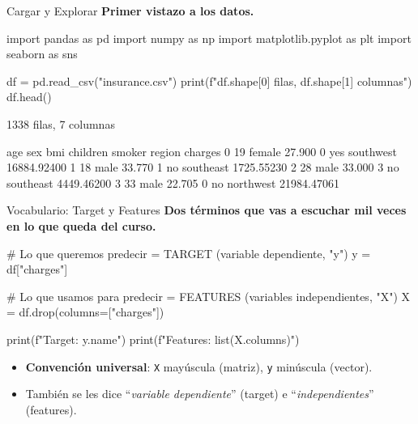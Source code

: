 \documentclass[aspectratio=169, 11pt]{beamer}
\begin{document}
\begin{frame}[fragile,shrink=38]{Cargar y Explorar}
  \vspace{-6pt}
  {\footnotesize\color{arcaDark}\bfseries
    Primer vistazo a los datos.}

  \vspace{4pt}
  \begin{pyblock}
import pandas as pd
import numpy as np
import matplotlib.pyplot as plt
import seaborn as sns

df = pd.read_csv("insurance.csv")
print(f"{df.shape[0]} filas, {df.shape[1]} columnas")
df.head()
  \end{pyblock}

  \vspace{4pt}
  \begin{outputblock}
1338 filas, 7 columnas

   age     sex     bmi  children smoker     region      charges
0   19  female  27.900         0    yes  southwest  16884.92400
1   18    male  33.770         1     no  southeast   1725.55230
2   28    male  33.000         3     no  southeast   4449.46200
3   33    male  22.705         0     no  northwest  21984.47061
  \end{outputblock}
\end{frame}

\begin{frame}[fragile,shrink=28]{Vocabulario: Target y Features}
  \vspace{-6pt}
  {\footnotesize\color{arcaDark}\bfseries
    Dos términos que vas a escuchar mil veces en lo que queda del curso.}

  \vspace{4pt}
  \begin{pyblock}
# Lo que queremos predecir = TARGET (variable dependiente, "y")
y = df["charges"]

# Lo que usamos para predecir = FEATURES (variables independientes, "X")
X = df.drop(columns=["charges"])

print(f"Target:   {y.name}")
print(f"Features: {list(X.columns)}")
  \end{pyblock}

  \vspace{4pt}
  {\scriptsize\color{textMuted}
  \begin{itemize}\setlength{\itemsep}{3pt}
    \item[{\color{arcaRed}\scriptsize\faArrowRight}]
      \textbf{Convención universal}: \texttt{X} mayúscula (matriz),
      \texttt{y} minúscula (vector).
    \item[{\color{arcaRed}\scriptsize\faArrowRight}]
      También se les dice ``\textit{variable dependiente}'' (target)
      e ``\textit{independientes}'' (features).
  \end{itemize}
  }
\end{frame}
\end{document}
